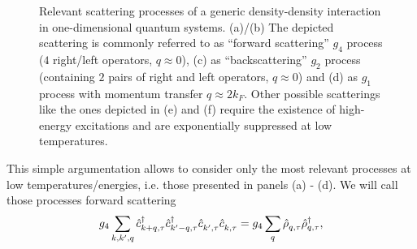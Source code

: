 \begin{figure}
    \caption{Relevant scattering processes of a generic density-density interaction in one-dimensional quantum systems. (a)/(b) The depicted scattering is commonly referred to as ``forward scattering'' $g_4$ process ($4$ right/left operators, $q\approx0$), (c) as ``backscattering'' $g_2$ process (containing $2$ pairs of right and left operators, $q\approx0$) and (d) as $g_1$ process with momentum transfer $q\approx 2k_F$. Other possible scatterings like the ones depicted in (e) and (f) require the existence of high-energy excitations and are exponentially suppressed at low temperatures.}
    \label{fig:scattering_processes}
\end{figure}
This simple argumentation allows to consider only the most relevant processes at low temperatures/energies, i.e. those presented in panels (a) - (d).
We will call those processes forward scattering
\begin{align}
    g_4\sum_{k,k',q}\hat c^\dag_{k+q,\tau}\hat c^\dag_{k'-q,\tau}\hat c^\pdag_{k',\tau}\hat c^\pdag_{k,\tau} = g_4 \sum_q\hat\rho^\pdag_{q,\tau}\hat\rho^\dag_{q,\tau},
\end{align}
